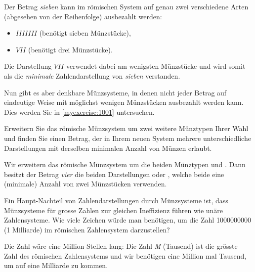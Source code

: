 \begin{myexample}\label{myexample:notUnique}
Der Betrag \textit{sieben} kann im römischen System auf genau zwei verschiedene Arten (abgesehen von der Reihenfolge) ausbezahlt werden:
\begin{itemize}
	\item $IIIIIII$ (benötigt sieben Münzstücke),
	\item $VII$ (benötigt drei Münzstücke).
\end{itemize}
Die Darstellung $VII$ verwendet dabei am wenigsten Münzstücke und wird somit als die \textit{minimale} Zahlendarstellung von
\textit{sieben} verstanden.
\end{myexample}
Nun gibt es aber denkbare Münzsysteme, in denen nicht jeder Betrag auf eindeutige Weise mit möglichst wenigen
Münzstücken ausbezahlt werden kann. Dies werden Sie in \cref{myexercise:1001} untersuchen.

\begin{myexercise}\label{myexercise:1001}
	Erweitern Sie das römische Münzsystem um zwei weitere Münztypen Ihrer Wahl und finden Sie einen Betrag, der in Ihrem
	neuen System mehrere unterschiedliche Darstellungen mit derselben minimalen Anzahl von Münzen erlaubt.
	\begin{myanswer}
		Wir erweitern das römische Münzsystem um die beiden Münztypen  und . Dann besitzt der Betrag
		\textit{vier} die beiden Darstellungen  oder \coin{II}, welche beide eine (minimale) Anzahl von zwei Münzstücken verwenden.
	\end{myanswer}
\end{myexercise}


\begin{myexercise}\label{myexercise:grosse-roem-zahlen}
	Ein Haupt-Nachteil von Zahlendarstellungen durch Münzsysteme ist, dass Münzsysteme für grosse Zahlen zur gleichen Ineffizienz führen wie unäre Zahlensysteme. Wie viele Zeichen würde man benötigen, um die Zahl \num{1000000000} (1 Milliarde) im römischen Zahlensystem darzustellen?
	\begin{myanswer}
		Die Zahl wäre eine Million Stellen lang: Die Zahl \textit{M} (Tausend) ist die grösste Zahl des römischen Zahlensystems und wir benötigen eine Million mal Tausend, um auf eine Milliarde zu kommen.
	\end{myanswer}
\end{myexercise}
